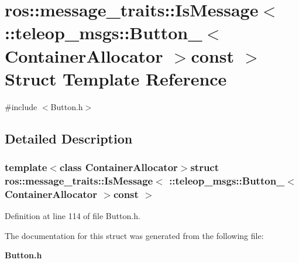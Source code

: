 \section{ros::message\_\-traits::IsMessage$<$ ::teleop\_\-msgs::Button\_\-$<$ ContainerAllocator $>$const $>$ Struct Template Reference}
\label{structros_1_1message__traits_1_1IsMessage_3_01_1_1teleop__msgs_1_1Button___3_01ContainerAllocator_01_4const_01_01_4}


{\ttfamily \#include $<$Button.h$>$}



\subsection{Detailed Description}
\subsubsection*{template$<$class ContainerAllocator$>$struct ros::message\_\-traits::IsMessage$<$ ::teleop\_\-msgs::Button\_\-$<$ ContainerAllocator $>$const  $>$}



Definition at line 114 of file Button.h.



The documentation for this struct was generated from the following file:\begin{DoxyCompactItemize}
\item 
{\bf Button.h}\end{DoxyCompactItemize}
